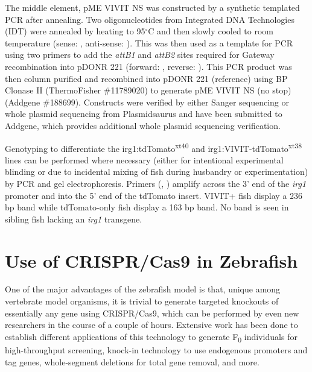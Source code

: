 The middle element, pME VIVIT NS was constructed by a synthetic templated PCR after annealing. Two oligonucleotides from Integrated DNA Technologies (IDT) were annealed by heating to 95$^{\circ}$C and then slowly cooled to room temperature (sense: , anti-sense: ). This was then used as a template for PCR using two primers to add the \textit{attB1} and \textit{attB2} sites required for Gateway recombination into pDONR 221 (forward: , reverse: ). This PCR product was then column purified and recombined into pDONR 221 (reference) using BP Clonase II (ThermoFisher \#11789020) to generate pME VIVIT NS (no stop) (Addgene \#188699). Constructs were verified by either Sanger sequencing or whole plasmid sequencing from Plasmidsaurus and have been submitted to Addgene, which provides additional whole plasmid sequencing verification.

Genotyping to differentiate the irg1:tdTomato\textsuperscript{xt40} and irg1:VIVIT-tdTomato\textsuperscript{xt38} lines can be performed where necessary (either for intentional experimental blinding or due to incidental mixing of fish during husbandry or experimentation) by PCR and gel electrophoresis. Primers (, ) amplify across the 3' end of the \textit{irg1} promoter and into the 5' end of the tdTomato insert. VIVIT+ fish display a 236 bp band while tdTomato-only fish display a 163 bp band. No band is seen in sibling fish lacking an \textit{irg1} transgene. 

\section{Use of CRISPR/Cas9 in Zebrafish}

One of the major advantages of the zebrafish model is that, unique among vertebrate model organisms, it is trivial to generate targeted knockouts of essentially any gene using CRISPR/Cas9, which can be performed by even new researchers in the course of a couple of hours. Extensive work has been done to establish different applications of this technology to generate F\textsubscript{0} individuals for high-throughput screening, knock-in technology to use endogenous promoters and tag genes, whole-segment deletions for total gene removal, and more. 

